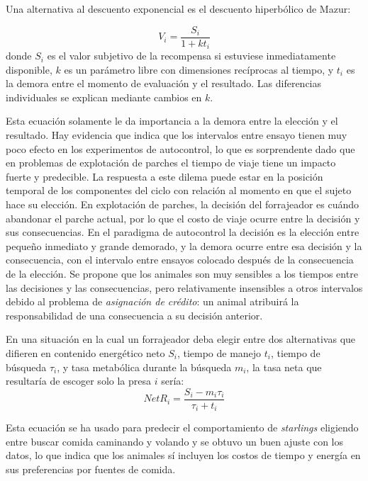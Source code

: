 \documentclass[a4paper,12pt]{article}
\begin{document}
Una alternativa al descuento exponencial es el descuento hiperbólico de Mazur:

\begin{equation}
	V_{i} = 
	\frac{
		S_{i}
	}{
		1+k t_{i}
	}
\end{equation}
donde $S_{i}$ es el valor subjetivo de la recompensa si estuviese inmediatamente disponible, $k$ es un parámetro libre con dimensiones recíprocas al tiempo, y $t_{i}$ es la demora entre el momento de evaluación y el resultado. Las diferencias individuales se explican mediante cambios en $k$.

Esta ecuación solamente le da importancia a la demora entre la elección y el resultado. Hay evidencia que indica que los intervalos entre ensayo tienen muy poco efecto en los experimentos de autocontrol, lo que es sorprendente dado que en problemas de explotación de parches el tiempo de viaje tiene un impacto fuerte y predecible. La respuesta a este dilema puede estar en la posición temporal de los componentes del ciclo con relación al momento en que el sujeto hace su elección. En explotación de parches, la decisión del forrajeador es cuándo abandonar el parche actual, por lo que el costo de viaje ocurre entre la decisión y sus consecuencias. En el paradigma de autocontrol la decisión es la elección entre pequeño inmediato y grande demorado, y la demora ocurre entre esa decisión y la consecuencia, con el intervalo entre ensayos colocado después de la consecuencia de la elección. Se propone que los animales son muy sensibles a los tiempos entre las decisiones y las consecuencias, pero relativamente insensibles a otros intervalos debido al problema de {\itshape asignación de crédito}: un animal atribuirá la responsabilidad de una consecuencia a su decisión anterior.

En una situación en la cual un forrajeador deba elegir entre dos alternativas que difieren en contenido energético neto $S_{i}$, tiempo de manejo $t_{i}$, tiempo de búsqueda $\tau_{i}$, y tasa metabólica durante la búsqueda $m_{i}$, la tasa neta que resultaría de escoger solo la presa $i$ sería:
\begin{equation}
	NetR_{i}=
	\frac{
		S_{i} - m_{i} \tau_{i}
	}{
		\tau_{i} + t_{i}
	}
\end{equation}

Esta ecuación se ha usado para predecir el comportamiento de {\itshape starlings} eligiendo entre buscar comida caminando y volando y se obtuvo un buen ajuste con los datos, lo que indica que los animales sí incluyen los costos de tiempo y energía en sus preferencias por fuentes de comida.
\end{document}
